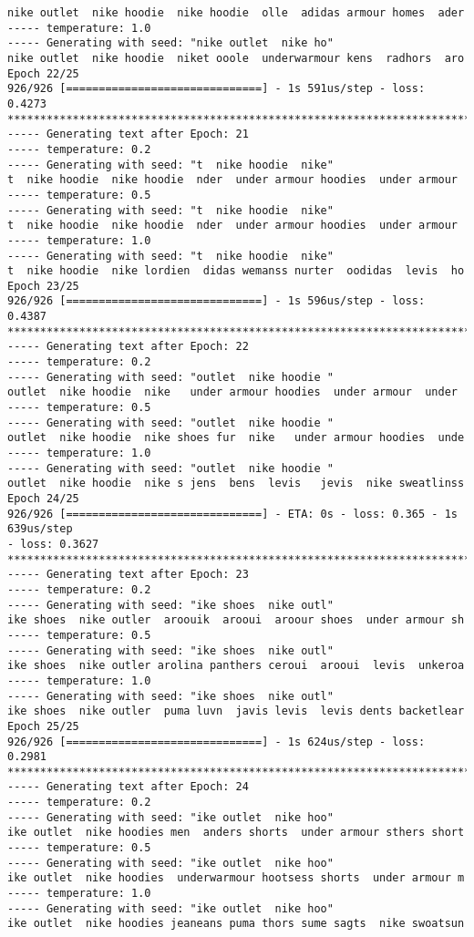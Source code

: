 \documentclass[11pt]{article}
\begin{document}
\begin{Verbatim}[commandchars=\\\{\}]
nike outlet  nike hoodie  nike hoodie  olle  adidas armour homes  ader
----- temperature: 1.0
----- Generating with seed: "nike outlet  nike ho"
nike outlet  nike hoodie  niket ooole  underwarmour kens  radhors  aro
Epoch 22/25
926/926 [==============================] - 1s 591us/step - loss: 0.4273
****************************************************************************
----- Generating text after Epoch: 21
----- temperature: 0.2
----- Generating with seed: "t  nike hoodie  nike"
t  nike hoodie  nike hoodie  nder  under armour hoodies  under armour
----- temperature: 0.5
----- Generating with seed: "t  nike hoodie  nike"
t  nike hoodie  nike hoodie  nder  under armour hoodies  under armour
----- temperature: 1.0
----- Generating with seed: "t  nike hoodie  nike"
t  nike hoodie  nike lordien  didas wemanss nurter  oodidas  levis  ho
Epoch 23/25
926/926 [==============================] - 1s 596us/step - loss: 0.4387
****************************************************************************
----- Generating text after Epoch: 22
----- temperature: 0.2
----- Generating with seed: "outlet  nike hoodie "
outlet  nike hoodie  nike   under armour hoodies  under armour  under
----- temperature: 0.5
----- Generating with seed: "outlet  nike hoodie "
outlet  nike hoodie  nike shoes fur  nike   under armour hoodies  unde
----- temperature: 1.0
----- Generating with seed: "outlet  nike hoodie "
outlet  nike hoodie  nike s jens  bens  levis   jevis  nike sweatlinss
Epoch 24/25
926/926 [==============================] - ETA: 0s - loss: 0.365 - 1s 639us/step
- loss: 0.3627
****************************************************************************
----- Generating text after Epoch: 23
----- temperature: 0.2
----- Generating with seed: "ike shoes  nike outl"
ike shoes  nike outler  aroouik  arooui  aroour shoes  under armour sh
----- temperature: 0.5
----- Generating with seed: "ike shoes  nike outl"
ike shoes  nike outler arolina panthers ceroui  arooui  levis  unkeroa
----- temperature: 1.0
----- Generating with seed: "ike shoes  nike outl"
ike shoes  nike outler  puma luvn  javis levis  levis dents backetlear
Epoch 25/25
926/926 [==============================] - 1s 624us/step - loss: 0.2981
****************************************************************************
----- Generating text after Epoch: 24
----- temperature: 0.2
----- Generating with seed: "ike outlet  nike hoo"
ike outlet  nike hoodies men  anders shorts  under armour sthers short
----- temperature: 0.5
----- Generating with seed: "ike outlet  nike hoo"
ike outlet  nike hoodies  underwarmour hootsess shorts  under armour m
----- temperature: 1.0
----- Generating with seed: "ike outlet  nike hoo"
ike outlet  nike hoodies jeaneans puma thors sume sagts  nike swoatsun
    \end{Verbatim}
\end{document}
